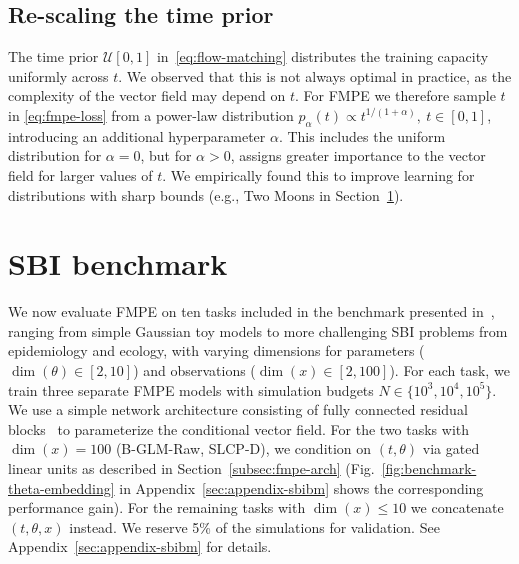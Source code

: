 \documentclass{article}
\theoremstyle{remark}
\begin{document}
\subsection{Re-scaling the time prior}\label{subsec:t-weighting}
The time prior $\mathcal{U}[0,1]$ in~\eqref{eq:flow-matching} distributes the training capacity uniformly across $t$. We observed that this is not always optimal in practice, as the complexity of the vector field may depend on $t$. For FMPE we therefore sample $t$ in \eqref{eq:fmpe-loss} from a power-law distribution $p_\alpha(t) \propto t^{1 / (1 + \alpha)},~t\in[0,1]$, introducing an additional hyperparameter $\alpha$. This includes the uniform distribution for $\alpha=0$, but for $\alpha>0$, assigns greater importance to the vector field for larger values of $t$. We empirically found this to improve  learning for distributions with sharp bounds (e.g., Two Moons in Section~\ref{sec:sbibm}).

\section{SBI benchmark}
\label{sec:sbibm}
We now evaluate FMPE on ten tasks included in the benchmark presented in~\cite{lueckmann2021benchmarking},  ranging from simple Gaussian toy models to more challenging SBI problems from epidemiology and ecology, with varying dimensions for parameters ($\dim(\theta)\in[2,10]$) and observations ($\dim(x)\in[2,100]$). For each task, we train three separate FMPE models with simulation budgets $N\in\{10^3, 10^4, 10^5\}$. We use a simple network architecture consisting of fully connected residual blocks~\cite{he2015deep} to parameterize the conditional vector field. For the two tasks with $\dim (x) = 100$ (B-GLM-Raw, SLCP-D), we condition on $(t,\theta)$ via gated linear units as described in Section~\ref{subsec:fmpe-arch} (Fig.~\ref{fig:benchmark-theta-embedding} in Appendix~\ref{sec:appendix-sbibm} shows the corresponding performance gain). For the remaining tasks with $\dim(x)\leq 10$ we concatenate $(t,\theta,x)$ instead. We reserve 5\% of the simulations for validation. See Appendix~\ref{sec:appendix-sbibm} for details.
\end{document}
